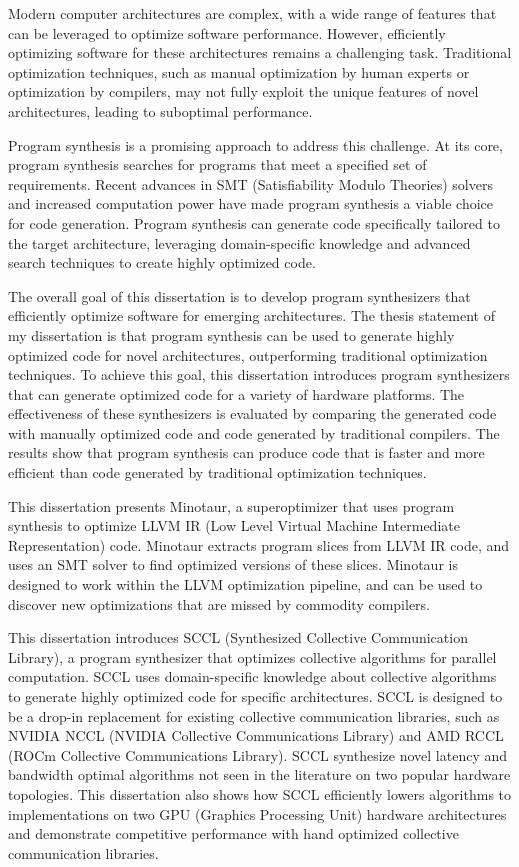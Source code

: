 Modern computer architectures are complex, with a wide range of
features that can be leveraged to optimize software performance.
However, efficiently optimizing software for these architectures
remains a challenging task. Traditional optimization techniques,
such as manual optimization by human experts or optimization by
compilers, may not fully exploit the unique features of novel
architectures, leading to suboptimal performance.

Program synthesis is a promising approach to address this challenge.
At its core, program synthesis searches for programs that meet a
specified set of requirements. Recent advances in SMT (Satisfiability
Modulo Theories) solvers and increased computation power have made
program synthesis a viable choice for code generation. Program
synthesis can generate code specifically tailored to the target
architecture, leveraging domain-specific knowledge and advanced search
techniques to create highly optimized code.

The overall goal of this dissertation is to develop program
synthesizers that efficiently optimize software for emerging
architectures. The thesis statement of my dissertation is that program
synthesis can be used to generate highly optimized code for novel
architectures, outperforming traditional optimization techniques. To
achieve this goal, this dissertation introduces program synthesizers
that can generate optimized code for a variety of hardware platforms.
The effectiveness of these synthesizers is evaluated by comparing the
generated code with manually optimized code and code generated by
traditional compilers. The results show that program synthesis can
produce code that is faster and more efficient than code generated by
traditional optimization techniques.

This dissertation presents Minotaur, a superoptimizer that uses
program synthesis to optimize LLVM IR (Low Level Virtual Machine
Intermediate Representation) code. Minotaur extracts program slices
from LLVM IR code, and uses an SMT solver to find optimized versions
of these slices. Minotaur is designed to work within the LLVM
optimization pipeline, and can be used to discover new optimizations
that are missed by commodity compilers.

This dissertation introduces SCCL (Synthesized Collective
Communication Library), a program synthesizer that optimizes
collective algorithms for parallel computation. SCCL uses
domain-specific knowledge about collective algorithms to generate
highly optimized code for specific architectures. SCCL is designed to
be a drop-in replacement for existing collective communication
libraries, such as NVIDIA NCCL (NVIDIA Collective Communications
Library) and AMD RCCL (ROCm Collective Communications Library). SCCL
synthesize novel latency and bandwidth optimal algorithms not seen in
the literature on two popular hardware topologies. This dissertation
also shows how SCCL efficiently lowers algorithms to implementations
on two GPU (Graphics Processing Unit) hardware architectures and
demonstrate competitive performance with hand optimized collective
communication libraries.